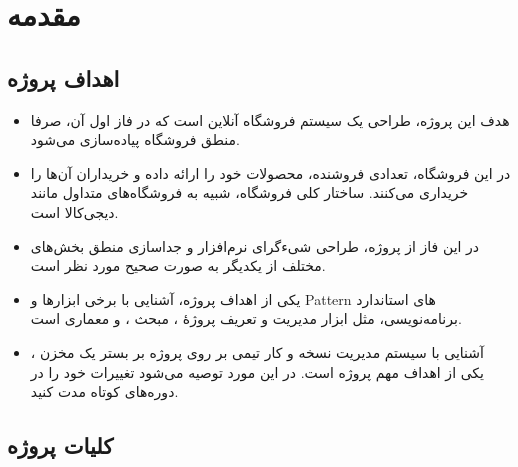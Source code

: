 \documentclass[]{article}
\begin{document}
\newpage

\section*{{\titr مقدمه}}

\subsection*{{\titr اهداف پروژه}}


\begin{itemize}

\item
هدف این پروژه، طراحی یک سیستم فروشگاه آنلاین است که در فاز اول آن، صرفا منطق فروشگاه پیاده‌سازی می‌شود.

\item
در این فروشگاه، تعدادی فروشنده، محصولات خود را ارائه داده و خریداران آن‌ها را خریداری می‌کنند. ساختار کلی فروشگاه، شبیه به فروشگاه‌های متداول مانند دیجی‌کالا است.

\item
در این فاز از پروژه، طراحی شی‌ءگرای نرم‌افزار و جداسازی منطق بخش‌های مختلف از یکدیگر به صورت صحیح مورد نظر است.

\item
یکی از اهداف پروژه، آشنایی با برخی ابزارها و Pattern های استاندارد برنامه‌نویسی، مثل ابزار مدیریت و تعریف پروژه‌ٔ 
\href{https://en.wikipedia.org/wiki/Apache_Maven}{\textcolor{blue}{\underline{}}}، 
مبحث
\href{https://en.wikipedia.org/wiki/Unit_testing}{\textcolor{blue} {\underline{}}}،
 و معماری
 \href{https://www.geeksforgeeks.org/mvc-design-pattern/}{\textcolor{blue} {\underline{}}} 
  است.

\item
آشنایی با سیستم مدیریت نسخه  و کار تیمی بر روی پروژه بر بستر یک مخزن ، یکی از اهداف مهم پروژه است. در این مورد توصیه می‌شود تغییرات خود را در دوره‌های کوتاه مدت  کنید.

\end{itemize}

\subsection*{{\titr کلیات پروژه}}
\end{document}
